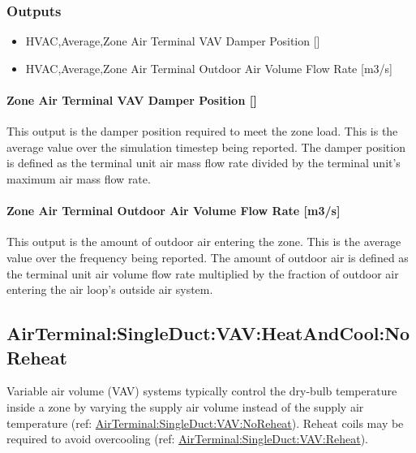 \subsubsection{Outputs}\label{outputs-5}

\begin{itemize}
\item
  HVAC,Average,Zone Air Terminal VAV Damper Position {[]}
\item
  HVAC,Average,Zone Air Terminal Outdoor Air Volume Flow Rate {[}m3/s{]}
\end{itemize}

\paragraph{Zone Air Terminal VAV Damper Position {[]}}\label{zone-air-terminal-vav-damper-position-3}

This output is the damper position required to meet the zone load. This is the average value over the simulation timestep being reported. The damper position is defined as the terminal unit air mass flow rate divided by the terminal unit's maximum air mass flow rate.

\paragraph{Zone Air Terminal Outdoor Air Volume Flow Rate {[}m3/s{]}}

This output is the amount of outdoor air entering the zone. This is the average value over the frequency being reported. The amount of outdoor air is defined as the terminal unit air volume flow rate multiplied by the fraction of outdoor air entering the air loop's outside air system.

\subsection{AirTerminal:SingleDuct:VAV:HeatAndCool:NoReheat}\label{airterminalsingleductvavheatandcoolnoreheat}

Variable air volume (VAV) systems typically control the dry-bulb temperature inside a zone by varying the supply air volume instead of the supply air temperature (ref: \hyperref[airterminalsingleductvavnoreheat]{AirTerminal:SingleDuct:VAV:NoReheat}). Reheat coils may be required to avoid overcooling (ref: \hyperref[airterminalsingleductvavreheat]{AirTerminal:SingleDuct:VAV:Reheat}).

